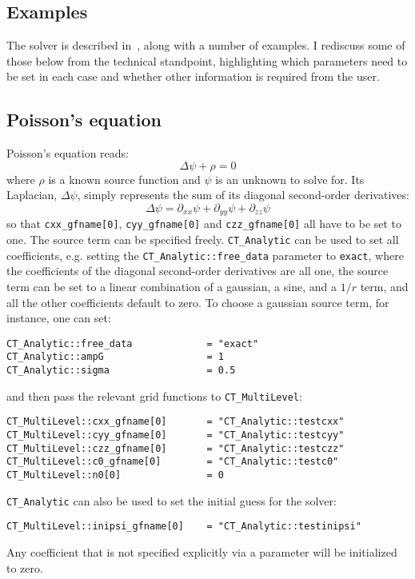 \subsection{Examples}
The solver is described in~\cite{Bentivegna:2013xna}, along with a number
of examples. I rediscuss some of those below from the technical
standpoint, highlighting which parameters need to be set in each case
and whether other information is required from the user.

\subsection{Poisson's equation}
Poisson's equation reads:
\begin{equation}
\Delta \psi + \rho = 0
\end{equation}
where $\rho$ is a known source function and $\psi$ is an unknown
to solve for. Its Laplacian, $\Delta \psi$, simply represents the
sum of its diagonal second-order derivatives:
\begin{equation}
\Delta \psi = \partial_{xx} \psi + \partial_{yy} \psi + \partial_{zz} \psi
\end{equation}
so that \texttt{cxx\_gfname[0]}, \texttt{cyy\_gfname[0]} and \texttt{czz\_gfname[0]}
all have to be set to one. The source term can be specified freely.
\texttt{CT\_Analytic} can be used to set all coefficients, e.g. 
setting the \texttt{CT\_Analytic::free\_data} parameter to \texttt{exact}, 
where the coefficients of the diagonal second-order derivatives are
all one, the source term can be set to a linear combination of a
gaussian, a sine, and a $1/r$ term, and all the other coefficients
default to zero. To choose a gaussian source term, for instance, one
can set:
\begin{verbatim}
CT_Analytic::free_data             = "exact"
CT_Analytic::ampG                  = 1
CT_Analytic::sigma                 = 0.5
\end{verbatim}
and then pass the relevant grid functions to \texttt{CT\_MultiLevel}:
\begin{verbatim}
CT_MultiLevel::cxx_gfname[0]       = "CT_Analytic::testcxx"
CT_MultiLevel::cyy_gfname[0]       = "CT_Analytic::testcyy"
CT_MultiLevel::czz_gfname[0]       = "CT_Analytic::testczz"
CT_MultiLevel::c0_gfname[0]        = "CT_Analytic::testc0"
CT_MultiLevel::n0[0]               = 0
\end{verbatim}
\texttt{CT\_Analytic} can also be used to set the initial guess for
the solver:
\begin{verbatim}
CT_MultiLevel::inipsi_gfname[0]    = "CT_Analytic::testinipsi"
\end{verbatim}
Any coefficient that is not specified explicitly via a parameter 
will be initialized to zero.

